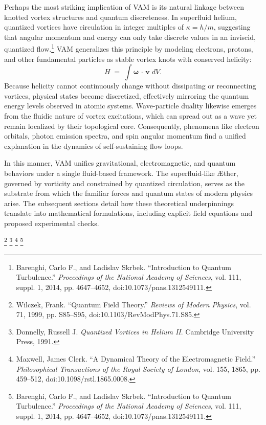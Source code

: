 Perhaps the most striking implication of VAM is its natural linkage between knotted vortex structures and quantum discreteness. In superfluid helium, quantized vortices have circulation in integer multiples of \(\kappa = h / m\), suggesting that angular momentum and energy can only take discrete values in an inviscid, quantized flow.\footnote{Barenghi, Carlo F., and Ladislav Skrbek. “Introduction to Quantum Turbulence.” \textit{Proceedings of the National Academy of Sciences}, vol. 111, suppl. 1, 2014, pp. 4647–4652, doi:10.1073/pnas.1312549111.} VAM generalizes this principle by modeling electrons, protons, and other fundamental particles as stable vortex knots with conserved helicity:
\[
    H \;=\; \int \boldsymbol{\omega} \,\cdot\, \mathbf{v}\; dV.
\]
Because helicity cannot continuously change without dissipating or reconnecting vortices, physical states become discretized, effectively mirroring the quantum energy levels observed in atomic systems. Wave-particle duality likewise emerges from the fluidic nature of vortex excitations, which can spread out as a wave yet remain localized by their topological core. Consequently, phenomena like electron orbitals, photon emission spectra, and spin angular momentum find a unified explanation in the dynamics of self-sustaining flow loops.

In this manner, VAM unifies gravitational, electromagnetic, and quantum behaviors under a single fluid-based framework. The superfluid-like Æther, governed by vorticity and constrained by quantized circulation, serves as the substrate from which the familiar forces and quantum states of modern physics arise. The subsequent sections detail how these theoretical underpinnings translate into mathematical formulations, including explicit field equations and proposed experimental checks.

\footnote{Wilczek, Frank. “Quantum Field Theory.” \textit{Reviews of Modern Physics}, vol. 71, 1999, pp. S85–S95, doi:10.1103/RevModPhys.71.S85.}
\footnote{Donnelly, Russell J. \textit{Quantized Vortices in Helium II}. Cambridge University Press, 1991.}
\footnote{Maxwell, James Clerk. “A Dynamical Theory of the Electromagnetic Field.” \textit{Philosophical Transactions of the Royal Society of London}, vol. 155, 1865, pp. 459–512, doi:10.1098/rstl.1865.0008.}
\footnote{Barenghi, Carlo F., and Ladislav Skrbek. “Introduction to Quantum Turbulence.” \textit{Proceedings of the National Academy of Sciences}, vol. 111, suppl. 1, 2014, pp. 4647–4652, doi:10.1073/pnas.1312549111.}